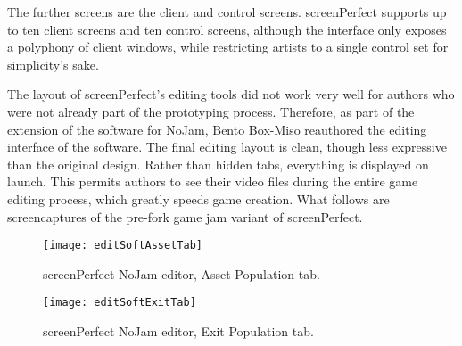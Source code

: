 The further screens are the client and control screens. screenPerfect supports up to ten client screens and ten control screens, although the interface only exposes a polyphony of client windows, while restricting artists to a single control set for simplicity's sake.

The layout of screenPerfect's editing tools did not work very well for authors who were not already part of the prototyping process. Therefore, as part of the extension of the software for NoJam, Bento Box-Miso reauthored the editing interface of the software. 
The final editing layout is clean, though less expressive than the original design. Rather than hidden tabs, everything is displayed on launch. This permits authors to see their video files during the entire game editing process, which greatly speeds game creation. 
What follows are screencaptures of the pre-fork game jam variant of screenPerfect.

\newpage
\begin{figure}[h]
 \caption{screenPerfect NoJam editor, Asset Population tab.}
 \centering
 \texttt{[image: editSoftAssetTab]}
\end{figure}

\begin{figure}[h]
 \caption{screenPerfect NoJam editor, Exit Population tab.}
 \centering
 \texttt{[image: editSoftExitTab]}
\end{figure}

\newpage 